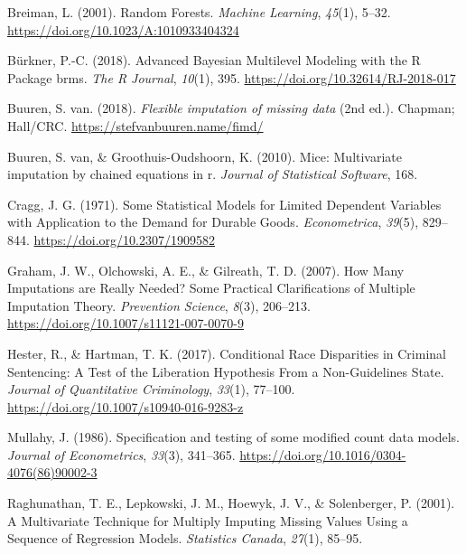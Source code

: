 \documentclass[
  letterpaper,
  DIV=11,
  numbers=noendperiod]{scrartcl}
\newlength{\cslhangindent}
\newlength{\cslentryspacingunit} %
\newenvironment{CSLReferences}[2] %
 {%
  \setlength{\parindent}{0pt}
  \ifodd #1
  \let\oldpar\par
  \def\par{\hangindent=\cslhangindent\oldpar}
  \fi
  \setlength{\parskip}{#2\cslentryspacingunit}
 }%
 {}
\begin{document}
\hypertarget{refs}{}
\begin{CSLReferences}{1}{0}
\leavevmode{}%
Breiman, L. (2001). Random Forests. \emph{Machine Learning},
\emph{45}(1), 5--32. \url{https://doi.org/10.1023/A:1010933404324}

\leavevmode{}%
Bürkner, P.-C. (2018). Advanced Bayesian Multilevel Modeling with the R
Package brms. \emph{The R Journal}, \emph{10}(1), 395.
\url{https://doi.org/10.32614/RJ-2018-017}

\leavevmode{}%
Buuren, S. van. (2018). \emph{Flexible imputation of missing data} (2nd
ed.). Chapman; Hall/CRC. \url{https://stefvanbuuren.name/fimd/}

\leavevmode{}%
Buuren, S. van, \& Groothuis-Oudshoorn, K. (2010). Mice: Multivariate
imputation by chained equations in r. \emph{Journal of Statistical
Software}, 168.

\leavevmode{}%
Cragg, J. G. (1971). Some {Statistical Models} for {Limited Dependent
Variables} with {Application} to the {Demand} for {Durable Goods}.
\emph{Econometrica}, \emph{39}(5), 829--844.
\url{https://doi.org/10.2307/1909582}

\leavevmode{}%
Graham, J. W., Olchowski, A. E., \& Gilreath, T. D. (2007). How {Many
Imputations} are {Really Needed}? {Some Practical Clarifications} of
{Multiple Imputation Theory}. \emph{Prevention Science}, \emph{8}(3),
206--213. \url{https://doi.org/10.1007/s11121-007-0070-9}

\leavevmode{}%
Hester, R., \& Hartman, T. K. (2017). Conditional {Race Disparities} in
{Criminal Sentencing}: {A Test} of the {Liberation Hypothesis From} a
{Non-Guidelines State}. \emph{Journal of Quantitative Criminology},
\emph{33}(1), 77--100. \url{https://doi.org/10.1007/s10940-016-9283-z}

\leavevmode{}%
Mullahy, J. (1986). Specification and testing of some modified count
data models. \emph{Journal of Econometrics}, \emph{33}(3), 341--365.
\url{https://doi.org/10.1016/0304-4076(86)90002-3}

\leavevmode{}%
Raghunathan, T. E., Lepkowski, J. M., Hoewyk, J. V., \& Solenberger, P.
(2001). A {Multivariate Technique} for {Multiply Imputing Missing Values
Using} a {Sequence} of {Regression Models}. \emph{Statistics Canada},
\emph{27}(1), 85--95.


\end{CSLReferences}
\end{document}

